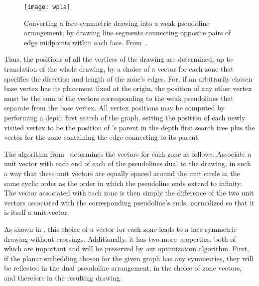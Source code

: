 \documentclass[11pt,letter]{article}
\begin{document}
\begin{figure}[t]
\centering\texttt{[image: wpla]}
\caption{Converting a face-symmetric drawing into a weak pseudoline
arrangement, by drawing line segments connecting opposite pairs of
edge midpoints within each face. From~\cite{Epp-GD-04}.}
\label{fig:wpla}
\end{figure}

Thus, the positions of all the vertices of the drawing are determined,
up to translation of the whole drawing, by a choice of a vector for each zone that specifies the direction and length of the zone's edges. For, if an arbitrarily chosen base vertex has its
placement fixed at the origin, the position of any other vertex 
must be the sum of the vectors corresponding to the weak pseudolines
that separate  from the base vertex. All vertex positions may be
computed by performing a depth first search of the graph, setting the
position of each newly visited vertex  to be the position of 's
parent in the depth first search tree plus the vector for the zone
containing the edge connecting  to its parent.

The algorithm from~\cite{Epp-GD-04} determines the vectors for each
zone as follows. Associate a unit vector with each end of each of the
pseudolines dual to the drawing, in such a way that these unit vectors
are equally spaced around the unit circle in the same cyclic order as
the order in which the pseudoline ends extend to infinity. The vector
associated with each zone is then simply the difference of the two
unit vectors associated with the corresponding pseudoline's ends,
normalized so that it is itself a unit vector.

As shown in \cite{Epp-GD-04}, this choice of a vector for each zone
leads to a face-symmetric drawing without crossings. Additionally, it
has two more properties, both of which are important and will be preserved by our optimization algorithm. First, if the planar embedding
chosen for the given graph has any symmetries, they will be reflected
in the dual pseudoline arrangement, in the choice of zone vectors, and
therefore in the resulting drawing.
\end{document}
